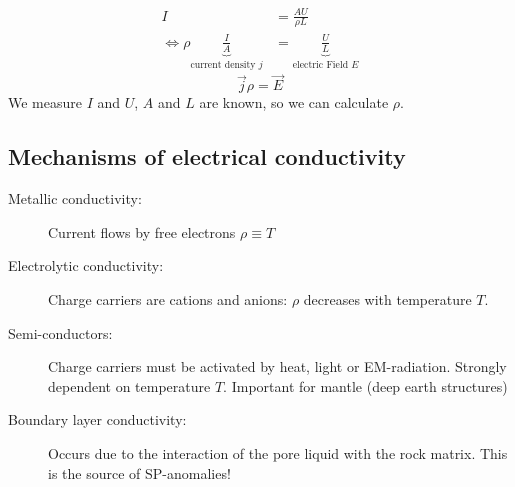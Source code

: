 \begin{align*}
I&=\frac{AU}{\rho L}\\
\Leftrightarrow \rho\underbrace{\frac{I}{A}}_{\textrm{current density }j}&=\underbrace{\frac{U}{L}}_{\textrm{electric Field }E}
\end{align*}
\begin{equation}
\vec{j}\rho=\vec{E}\label{eq:1-2}
\end{equation}
We measure $I$ and $U$, $A$ and $L$ are known, so we can calculate $\rho$.

\subsection{Mechanisms of electrical conductivity}
\begin{description}
\item[Metallic conductivity:] Current flows by free electrons $\rho\equiv T$
\item[Electrolytic conductivity:] Charge carriers are cations and anions: $\rho$ decreases with temperature $T$.
\item[Semi-conductors:] Charge carriers must be activated by heat, light or EM-radiation. Strongly dependent on temperature $T$. Important for mantle (deep earth structures)
\item[Boundary layer conductivity:] Occurs due to the interaction of the pore liquid with the rock matrix. This is the source of SP-anomalies!
\end{description}

